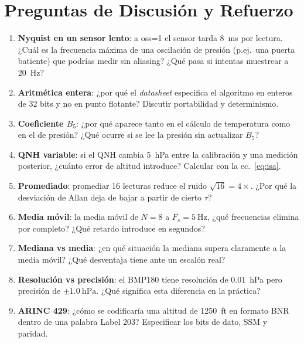 \documentclass[11pt]{article}
\begin{document}
\section{Preguntas de Discusión y Refuerzo}
\begin{enumerate}
  \item \textbf{Nyquist en un sensor lento}: a oss=1 el sensor tarda \SI{8}{\milli\second}
        por lectura. ¿Cuál es la frecuencia máxima de una oscilación de presión (p.ej.\ una
        puerta batiente) que podrías medir sin aliasing? ¿Qué pasa si intentas muestrear
        a \SI{20}{\hertz}?
  \item \textbf{Aritmética entera}: ¿por qué el \emph{datasheet} especifica el algoritmo
        en enteros de 32 bits y no en punto flotante? Discutir portabilidad y determinismo.
  \item \textbf{Coeficiente $B_5$}: ¿por qué aparece tanto en el cálculo de temperatura
        como en el de presión? ¿Qué ocurre si se lee la presión sin actualizar $B_5$?
  \item \textbf{QNH variable}: si el QNH cambia \SI{5}{\hecto\pascal} entre la calibración
        y una medición posterior, ¿cuánto error de altitud introduce? Calcular con la
        ec.~\eqref{eq:isa}.
  \item \textbf{Promediado}: promediar 16 lecturas reduce el ruido $\sqrt{16}=4\times$.
        ¿Por qué la desviación de Allan deja de bajar a partir de cierto $\tau$?
  \item \textbf{Media móvil}: la media móvil de $N=8$ a $F_s=\SI{5}{\hertz}$, ¿qué
        frecuencias elimina por completo? ¿Qué retardo introduce en segundos?
  \item \textbf{Mediana vs media}: ¿en qué situación la mediana supera claramente a la
        media móvil? ¿Qué desventaja tiene ante un escalón real?
  \item \textbf{Resolución vs precisión}: el BMP180 tiene resolución de
        \SI{0.01}{\hecto\pascal} pero precisión de $\pm\SI{1.0}{\hecto\pascal}$. ¿Qué
        significa esta diferencia en la práctica?
  \item \textbf{ARINC 429}: ¿cómo se codificaría una altitud de \SI{1250}{ft} en formato
        BNR dentro de una palabra Label 203? Especificar los bits de dato, SSM y paridad.
\end{enumerate}

\end{document}
